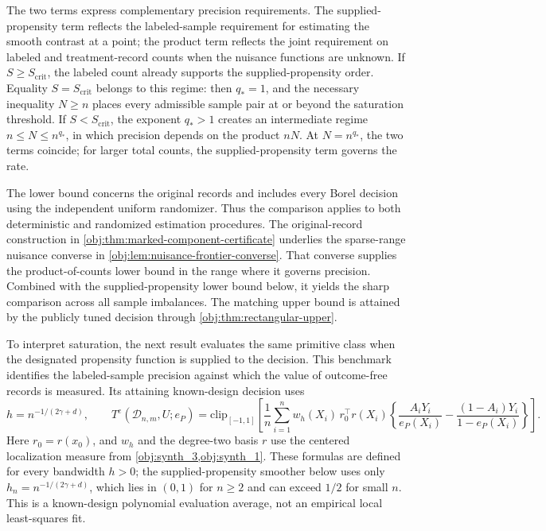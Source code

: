 \documentclass[11pt]{article}
\begin{document}
The two terms express complementary precision requirements. The supplied-propensity term reflects the labeled-sample requirement for estimating the smooth contrast at a point; the product term reflects the joint requirement on labeled and treatment-record counts when the nuisance functions are unknown. If \(S\ge S_{\mathrm{crit}}\), the labeled count already supports the supplied-propensity order. Equality \(S=S_{\mathrm{crit}}\) belongs to this regime: then \(q_*=1\), and the necessary inequality \(N\ge n\) places every admissible sample pair at or beyond the saturation threshold. If \(S<S_{\mathrm{crit}}\), the exponent \(q_*>1\) creates an intermediate regime \(n\le N\le n^{q_*}\), in which precision depends on the product \(nN\). At \(N=n^{q_*}\), the two terms coincide; for larger total counts, the supplied-propensity term governs the rate.

The lower bound concerns the original records and includes every Borel decision using the independent uniform randomizer. Thus the comparison applies to both deterministic and randomized estimation procedures. The original-record construction in \cref{obj:thm:marked-component-certificate} underlies the sparse-range nuisance converse in \cref{obj:lem:nuisance-frontier-converse}. That converse supplies the product-of-counts lower bound in the range where it governs precision. Combined with the supplied-propensity lower bound below, it yields the sharp comparison across all sample imbalances. The matching upper bound is attained by the publicly tuned decision through \cref{obj:thm:rectangular-upper}.

To interpret saturation, the next result evaluates the same primitive class when the designated propensity function is supplied to the decision. This benchmark identifies the labeled-sample precision against which the value of outcome-free records is measured. Its attaining known-design decision uses
\[
h=n^{-1/(2\gamma+d)},\qquad
T^e(\mathcal D_{n,m},U;e_P)
=\mathrm{clip}_{[-1,1]}\!\left[
\frac1n\sum_{i=1}^n
w_h(X_i)\,r_0^\top r(X_i)
\left\{
\frac{A_iY_i}{e_P(X_i)}-
\frac{(1-A_i)Y_i}{1-e_P(X_i)}
\right\}
\right].
\]
Here \(r_0=r(x_0)\), and \(w_h\) and the degree-two basis \(r\) use the centered localization measure from \cref{obj:synth_3,obj:synth_1}. These formulas are defined for every bandwidth \(h>0\); the supplied-propensity smoother below uses only \(h_n=n^{-1/(2\gamma+d)}\), which lies in \((0,1)\) for \(n\ge2\) and can exceed \(1/2\) for small \(n\). This is a known-design polynomial evaluation average, not an empirical local least-squares fit.
\end{document}
